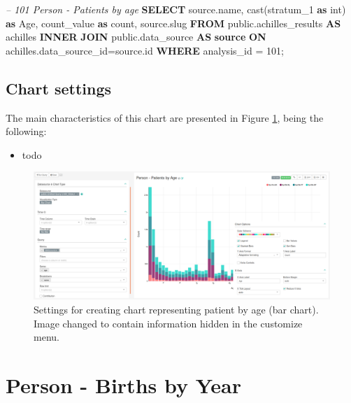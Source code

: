 \documentclass[]{book}
\newenvironment{Shaded}{\begin{snugshade}}{\end{snugshade}}
\newcommand{\KeywordTok}[1]{\textcolor[rgb]{0.13,0.29,0.53}{\textbf{#1}}}
\newcommand{\DataTypeTok}[1]{\textcolor[rgb]{0.13,0.29,0.53}{#1}}
\newcommand{\DecValTok}[1]{\textcolor[rgb]{0.00,0.00,0.81}{#1}}
\newcommand{\CommentTok}[1]{\textcolor[rgb]{0.56,0.35,0.01}{\textit{#1}}}
\newcommand{\FunctionTok}[1]{\textcolor[rgb]{0.00,0.00,0.00}{#1}}
\newcommand{\NormalTok}[1]{#1}
\providecommand{\tightlist}{%
  \setlength{\itemsep}{0pt}\setlength{\parskip}{0pt}}
\begin{document}
\begin{Shaded}
\begin{Highlighting}[]
\CommentTok{-- 101  Person - Patients by age}
\KeywordTok{SELECT}\NormalTok{ source.name,}
    \FunctionTok{cast}\NormalTok{(stratum_1 }\KeywordTok{as} \DataTypeTok{int}\NormalTok{) }\KeywordTok{as}\NormalTok{ Age,}
\NormalTok{    count_value }\KeywordTok{as} \FunctionTok{count}\NormalTok{, }
\NormalTok{    source.slug}
\KeywordTok{FROM}\NormalTok{ public.achilles_results }\KeywordTok{AS}\NormalTok{ achilles }\KeywordTok{INNER} \KeywordTok{JOIN} 
\NormalTok{    public.data_source }\KeywordTok{AS} \KeywordTok{source} \KeywordTok{ON}\NormalTok{ achilles.data_source_id=source.id}
\KeywordTok{WHERE}\NormalTok{ analysis_id = }\DecValTok{101}\NormalTok{;}
\end{Highlighting}
\end{Shaded}

\subsection{Chart settings}\label{chart-settings-7}

The main characteristics of this chart are presented in Figure
\ref{fig:personPatientsByAge}, being the following:

\begin{itemize}
\tightlist
\item
  todo
\end{itemize}

\begin{figure}
\includegraphics[width=1\linewidth]{images/personPatientsByAge} \caption{Settings for creating chart representing patient by age (bar chart). Image changed to contain information hidden in the customize menu.}\label{fig:personPatientsByAge}
\end{figure}

\section{Person - Births by Year}\label{person---births-by-year}
\end{document}
